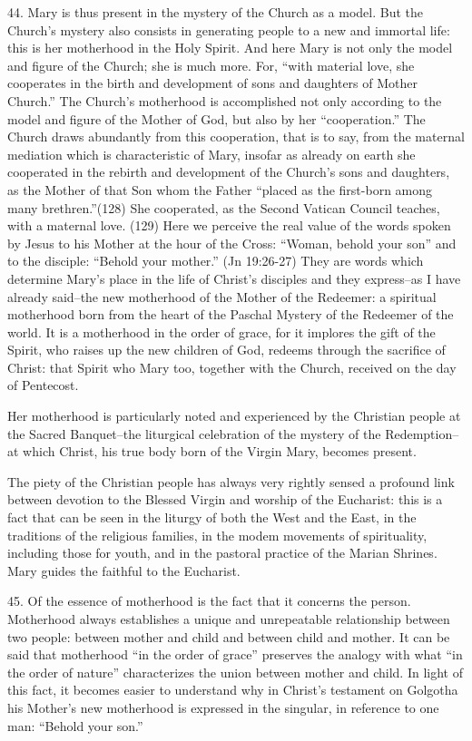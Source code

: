 \documentclass[oneside]{book}
\begin{document}
44. Mary is thus present in the mystery of the Church as a model. But the
Church's mystery also consists in generating people to a new and immortal life:
this is her motherhood in the Holy Spirit. And here Mary is not only the model
and figure of the Church; she is much more. For, ``with material love, she
cooperates in the birth and development of sons and daughters of Mother
Church.'' The Church's motherhood is accomplished not only according to the
model and figure of the Mother of God, but also by her ``cooperation.'' The
Church draws abundantly from this cooperation, that is to say, from the maternal
mediation which is characteristic of Mary, insofar as already on earth she
cooperated in the rebirth and development of the Church's sons and daughters, as
the Mother of that Son whom the Father ``placed as the first-born among many
brethren.''(128) She cooperated, as the Second Vatican Council teaches, with a
maternal love.
(129) Here we perceive the real value of the words spoken by Jesus to his Mother
at the hour of the Cross: ``Woman, behold your son'' and to the disciple:
``Behold your mother.'' (Jn 19:26-27) They are words which determine Mary's
place in the life of Christ's disciples and they express--as I have already
said--the new motherhood of the Mother of the Redeemer: a spiritual motherhood
born from the heart of the Paschal Mystery of the Redeemer of the world. It is a
motherhood in the order of grace, for it implores the gift of the Spirit, who
raises up the new children of God, redeems through the sacrifice of Christ: that
Spirit who Mary too, together with the Church, received on the day of Pentecost.

Her motherhood is particularly noted and experienced by the Christian people at
the Sacred Banquet--the liturgical celebration of the mystery of the
Redemption--at which Christ, his true body born of the Virgin Mary, becomes
present.

The piety of the Christian people has always very rightly sensed a profound link
between devotion to the Blessed Virgin and worship of the Eucharist: this is a
fact that can be seen in the liturgy of both the West and the East, in the
traditions of the religious families, in the modem movements of spirituality,
including those for youth, and in the pastoral practice of the Marian
Shrines. Mary guides the faithful to the Eucharist.

45. Of the essence of motherhood is the fact that it concerns the
person. Motherhood always establishes a unique and unrepeatable relationship
between two people: between mother and child and between child and mother. It
can be said that motherhood ``in the order of grace'' preserves the analogy with
what ``in the order of nature'' characterizes the union between mother and
child. In light of this fact, it becomes easier to understand why in Christ's
testament on Golgotha his Mother's new motherhood is expressed in the singular,
in reference to one man: ``Behold your son.''
\end{document}
